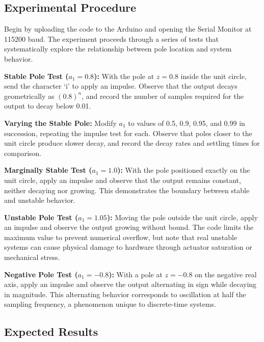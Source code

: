 \subsection{Experimental Procedure}

Begin by uploading the code to the Arduino and opening the Serial Monitor at 115200 baud. The experiment proceeds through a series of tests that systematically explore the relationship between pole location and system behavior.

\textbf{Stable Pole Test ($a_1 = 0.8$):} With the pole at $z = 0.8$ inside the unit circle, send the character `i' to apply an impulse. Observe that the output decays geometrically as $(0.8)^n$, and record the number of samples required for the output to decay below 0.01.

\textbf{Varying the Stable Pole:} Modify $a_1$ to values of 0.5, 0.9, 0.95, and 0.99 in succession, repeating the impulse test for each. Observe that poles closer to the unit circle produce slower decay, and record the decay rates and settling times for comparison.

\textbf{Marginally Stable Test ($a_1 = 1.0$):} With the pole positioned exactly on the unit circle, apply an impulse and observe that the output remains constant, neither decaying nor growing. This demonstrates the boundary between stable and unstable behavior.

\textbf{Unstable Pole Test ($a_1 = 1.05$):} Moving the pole outside the unit circle, apply an impulse and observe the output growing without bound. The code limits the maximum value to prevent numerical overflow, but note that real unstable systems can cause physical damage to hardware through actuator saturation or mechanical stress.

\textbf{Negative Pole Test ($a_1 = -0.8$):} With a pole at $z = -0.8$ on the negative real axis, apply an impulse and observe the output alternating in sign while decaying in magnitude. This alternating behavior corresponds to oscillation at half the sampling frequency, a phenomenon unique to discrete-time systems.

\subsection{Expected Results}

